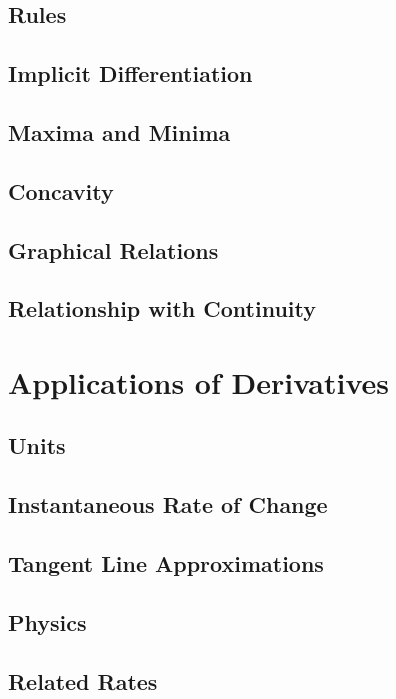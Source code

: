 \documentclass{article}
\begin{document}
\subsection{Rules} 
\subsection{Implicit Differentiation}
\subsection{Maxima and Minima} 
\subsection{Concavity} 
\subsection{Graphical Relations} 
\subsection{Relationship with Continuity} 
\newpage
\section{Applications of Derivatives}
\subsection{Units}
\subsection{Instantaneous Rate of Change}
\subsection{Tangent Line Approximations}
\subsection{Physics}
\subsection{Related Rates}
\end{document}

